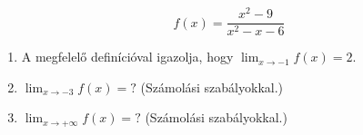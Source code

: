 \documentclass[11pt]{scrartcl}
\begin{document}
\[
	f(x) = \frac{x^2 - 9}{x^2 - x - 6}
\]
\begin{enumerate}
	\item A megfelelő definícióval igazolja, hogy
	      \(\displaystyle \lim_{x \to -1} f(x) = 2\).

	\item \(\displaystyle \lim_{x \to -3} f(x) = ?\) (Számolási szabályokkal.)

	\item \(\displaystyle \lim_{x \to +\infty} f(x) = ?\) (Számolási
	      szabályokkal.)
\end{enumerate}
\end{document}
